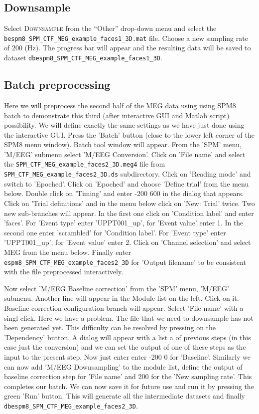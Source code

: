 \subsection{Downsample}
Select \textsc{Downsample} from the ``Other'' drop-down menu and select the \texttt{bespm8_SPM_CTF_MEG_example_faces1_3D.mat} file. Choose a new sampling rate of 200 (Hz). The progress bar will appear and the resulting data will be saved to dataset \texttt{dbespm8_SPM_CTF_MEG_example_faces1_3D}.


\subsection{Batch preprocessing}

Here we will preprocess the second half of the MEG data using using SPM8 batch to demonstrate this third (after interactive GUI and Matlab script) possibility. We will define exactly the same settings as we have just done using the interactive GUI. Press the 'Batch' button (close to the lower left corner of the SPM8 menu window). Batch tool window will appear. From the 'SPM' menu, 'M/EEG' submenu select 'M/EEG Conversion'. Click on 'File name' and select the \verb!SPM_CTF_MEG_example_faces2_3D.meg4! file from \verb!SPM_CTF_MEG_example_faces2_3D.ds! subdirectory. Click on 'Reading mode' and switch to 'Epoched'. Click on 'Epoched' and choose 'Define trial' from the menu below. Double click on 'Timing' and enter -200 600 in the dialog that appears. Click on 'Trial definitions' and in the menu below click on 'New: Trial' twice. Two new sub-branches will appear. In the first one click on 'Condition label' and enter 'faces'.  For 'Event type' enter 'UPPT001_up', for 'Event value' enter 1. In the second one enter 'scrambled' for 'Condition label'.  For 'Event type' enter 'UPPT001_up', for 'Event value' enter 2. Click on 'Channel selection' and select MEG from the menu below. Finally enter \verb!espm8_SPM_CTF_MEG_example_faces2_3D! for 'Output filename' to be consistent with the file preprocessed interactively. 

Now select 'M/EEG Baseline correction' from the 'SPM' menu, 'M/EEG' submenu. Another line will appear in the Module list on the left. Click on it. Baseline correction configuration branch will appear. Select 'File name' with a singl click. Here we have a problem. The file that we need to downsample has not been generated yet. This difficulty can be resolved by pressing on the 'Dependency' button. A dialog will appear with a list a of previous steps (in this case just the conversion) and we can set the output of one of these steps as the input to the present step. Now just enter enter -200 0 for 'Baseline'. Similarly we can now add 'M/EEG Downsampling' to the module list, define the output of baseline correction step for 'File name' and 200 for the 'New sampling rate'. This completes our batch. We can now save it for future use and run it by pressing the green 'Run' button. This will generate all the intermediate datasets and finally \texttt{dbespm8_SPM_CTF_MEG_example_faces2_3D}.

